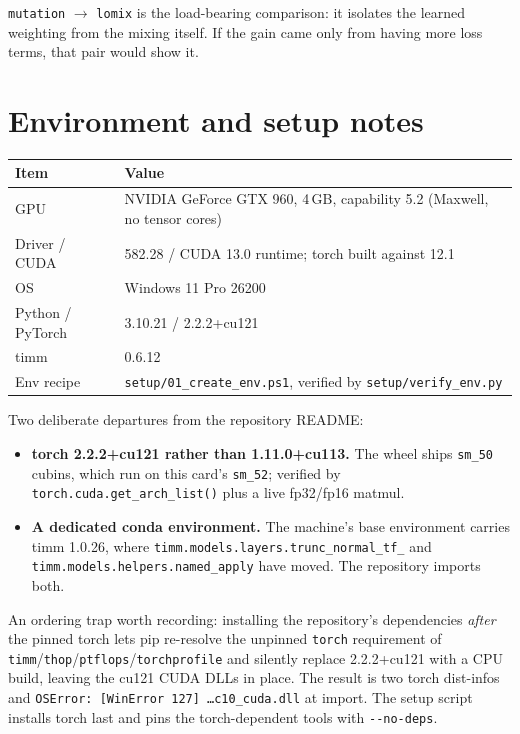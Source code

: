 \documentclass[11pt,a4paper]{article}
\newcommand{\code}[1]{\texttt{\small #1}}
\begin{document}
\code{mutation} $\rightarrow$ \code{lomix} is the load-bearing comparison: it
isolates the learned weighting from the mixing itself. If the gain came only
from having more loss terms, that pair would show it.

\section{Environment and setup notes}

\begin{center}
\begin{tabular}{@{}ll@{}}
\toprule
\textbf{Item} & \textbf{Value} \\
\midrule
GPU & NVIDIA GeForce GTX 960, 4\,GB, capability 5.2 (Maxwell, no tensor cores) \\
Driver / CUDA & 582.28 / CUDA 13.0 runtime; torch built against 12.1 \\
OS & Windows 11 Pro 26200 \\
Python / PyTorch & 3.10.21 / 2.2.2+cu121 \\
timm & 0.6.12 \\
Env recipe & \code{setup/01\_create\_env.ps1}, verified by \code{setup/verify\_env.py} \\
\bottomrule
\end{tabular}
\end{center}

Two deliberate departures from the repository README:

\begin{itemize}
\item \textbf{torch 2.2.2+cu121 rather than 1.11.0+cu113.} The wheel ships
\code{sm\_50} cubins, which run on this card's \code{sm\_52}; verified by
\code{torch.cuda.get\_arch\_list()} plus a live fp32/fp16 matmul.
\item \textbf{A dedicated conda environment.} The machine's base environment
carries timm 1.0.26, where \code{timm.models.layers.trunc\_normal\_tf\_} and
\code{timm.models.helpers.named\_apply} have moved. The repository imports both.
\end{itemize}

An ordering trap worth recording: installing the repository's dependencies
\emph{after} the pinned torch lets pip re-resolve the unpinned \code{torch}
requirement of \code{timm}/\code{thop}/\code{ptflops}/\code{torchprofile} and
silently replace 2.2.2+cu121 with a CPU build, leaving the cu121 CUDA DLLs in
place. The result is two torch dist-infos and
\code{OSError: [WinError 127] \ldots c10\_cuda.dll} at import. The setup script
installs torch last and pins the torch-dependent tools with \code{-{}-no-deps}.
\end{document}
